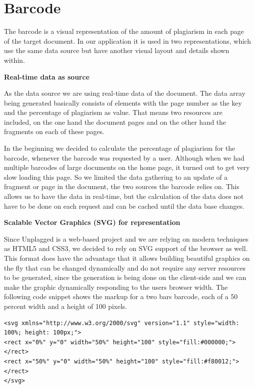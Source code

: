 \section{Barcode}
The barcode is a visual representation of the amount of plagiarism in each page of the target document. In our application it is used in two representations, which use the same data source but have another visual layout and details shown within.

\textbf{Real-time data as source}

As the data source we are using real-time data of the document. The data array being generated basically consists of elements with the page number as the key and the percentage of plagiarism as value. That means two resources are included, on the one hand the document pages and on the other hand the fragments on each of these pages.

In the beginning we decided to calculate the percentage of plagiarism for the barcode, whenever the barcode was requested by a user. Although when we had multiple barcodes of large documents on the home page, it turned out to get very slow loading this page. So we limited the data gathering to an update of a fragment or page in the document, the two sources the barcode relies on. This allows us to have the data in real-time, but the calculation of the data does not have to be done on each request and can be cached until the data base changes.

\textbf{Scalable Vector Graphics (SVG) for representation}

Since Unplagged is a web-based project and we are relying on modern techniques as HTML5 and CSS3, we decided to rely on SVG support of the browser as well. This format does have the advantage that it allows building beautiful graphics on the fly that can be changed dynamically and do not require any server resources to be generated, since the generation is being done on the client-side and we can make the graphic dynamically responding to the users browser width. The following code snippet shows the markup for a two bars barcode, each of a 50 percent width and a height of 100 pixels.

\begin{lstlisting}[caption=Barcode SVG markup]
<svg xmlns="http://www.w3.org/2000/svg" version="1.1" style="width: 100%; height: 100px;">
<rect x="0%" y="0" width="50%" height="100" style="fill:#000000;"></rect>
<rect x="50%" y="0" width="50%" height="100" style="fill:#f80012;"></rect>
</svg>
\end{lstlisting}

